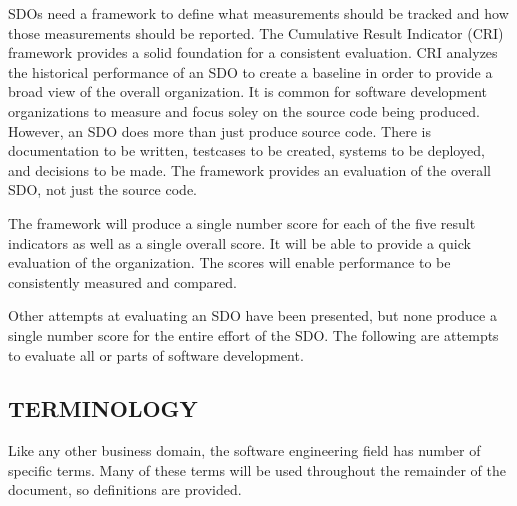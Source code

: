 \documentclass[SDSUThesis.tex]{subfiles}
\begin{document}
    SDOs need a framework to define
    what measurements should be tracked and how those measurements
    should be reported.  The Cumulative Result Indicator (CRI)
    framework provides a solid foundation
    for a consistent evaluation.  CRI analyzes the historical performance
    of an SDO
    to create a baseline in order to provide a broad
    view of the overall organization.  It is common for software development
    organizations to measure and focus soley on the source code
    being produced.  However, an SDO does more
    than just produce source code.  There is documentation to be
    written, testcases to be created, systems to be deployed, and
    decisions to be made.  The framework provides an evaluation
    of the overall SDO, not just the
    source code.
    
    The framework will produce a single number score for each of 
    the five result indicators as well as a single overall score.  
    It will be able to provide a quick evaluation of the organization.
    The scores will enable performance to be consistently measured
    and compared.

    Other attempts at evaluating an SDO
    have been presented, but none produce a single number score for
    the entire effort of the SDO. 
    The following are attempts to evaluate all or parts of 
    software development.


\subsection{TERMINOLOGY}
    Like any other business domain, the software engineering field has number
    of specific terms.  Many of these terms will be used throughout the remainder
    of the document, so definitions are provided.  
\end{document}
